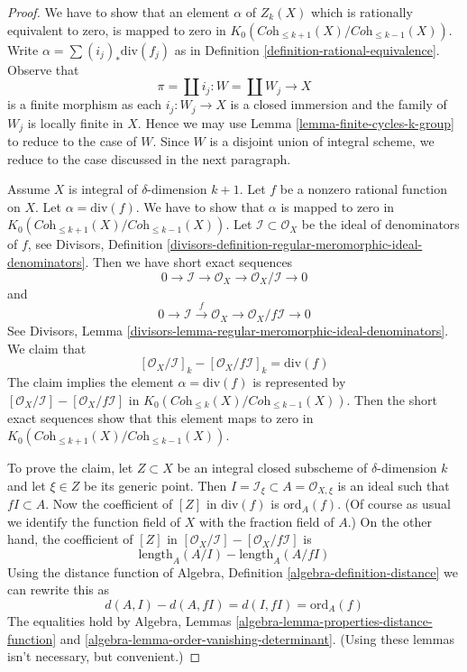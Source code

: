 \documentclass[10pt,a4paper]{amsart}
\theoremstyle{plain}
\theoremstyle{definition}
\theoremstyle{remark}
\numberwithin{equation}{subsection}
\begin{document}
\begin{proof}
We have to show that an element $\alpha$ of $Z_k(X)$ which is rationally
equivalent to zero, is mapped to zero in
$K_0(\textit{Coh}_{\leq k + 1}(X)/\textit{Coh}_{\leq k - 1}(X))$.
Write $\alpha = \sum (i_j)_*\text{div}(f_j)$ as in
Definition \ref{definition-rational-equivalence}.
Observe that
$$
\pi = \coprod i_j : W = \coprod W_j \longrightarrow X
$$
is a finite morphism as each $i_j : W_j \to X$ is a closed immersion
and the family of $W_j$ is locally finite in $X$. Hence we may use
Lemma \ref{lemma-finite-cycles-k-group} to reduce to the case of $W$.
Since $W$ is a disjoint union of integral scheme, we reduce
to the case discussed in the next paragraph.

\medskip\noindent
Assume $X$ is integral of $\delta$-dimension $k + 1$.
Let $f$ be a nonzero rational function on $X$.
Let $\alpha = \text{div}(f)$. We have to show that
$\alpha$ is mapped to zero in
$K_0(\textit{Coh}_{\leq k + 1}(X)/\textit{Coh}_{\leq k - 1}(X))$.
Let $\mathcal{I} \subset \mathcal{O}_X$ be the ideal of denominators
of $f$, see Divisors, Definition
\ref{divisors-definition-regular-meromorphic-ideal-denominators}.
Then we have short exact sequences
$$
0 \to \mathcal{I} \to \mathcal{O}_X \to \mathcal{O}_X/\mathcal{I} \to 0
$$
and
$$
0 \to \mathcal{I} \xrightarrow{f} \mathcal{O}_X \to
\mathcal{O}_X/f\mathcal{I} \to 0
$$
See Divisors, Lemma
\ref{divisors-lemma-regular-meromorphic-ideal-denominators}.
We claim that
$$
[\mathcal{O}_X/\mathcal{I}]_k - [\mathcal{O}_X/f\mathcal{I}]_k =
\text{div}(f)
$$
The claim implies the element $\alpha = \text{div}(f)$ is represented by
$[\mathcal{O}_X/\mathcal{I}] - [\mathcal{O}_X/f\mathcal{I}]$
in $K_0(\textit{Coh}_{\leq k}(X)/\textit{Coh}_{\leq k - 1}(X))$.
Then the short exact sequences show that this element maps to
zero in $K_0(\textit{Coh}_{\leq k + 1}(X)/\textit{Coh}_{\leq k - 1}(X))$.

\medskip\noindent
To prove the claim, let $Z \subset X$ be an integral closed subscheme
of $\delta$-dimension $k$ and let $\xi \in Z$ be its generic point.
Then $I = \mathcal{I}_\xi \subset A = \mathcal{O}_{X, \xi}$
is an ideal such that $fI \subset A$. Now the coefficient of
$[Z]$ in $\text{div}(f)$ is $\text{ord}_A(f)$. (Of course as usual
we identify the function field of $X$ with the fraction field of $A$.)
On the other hand, the coefficient of $[Z]$ in
$[\mathcal{O}_X/\mathcal{I}] - [\mathcal{O}_X/f\mathcal{I}]$
is
$$
\text{length}_A(A/I) - \text{length}_A(A/fI)
$$
Using the distance function of
Algebra, Definition \ref{algebra-definition-distance}
we can rewrite this as
$$
d(A, I) - d(A, fI) = d(I, fI) = \text{ord}_A(f)
$$
The equalities hold by Algebra, Lemmas
\ref{algebra-lemma-properties-distance-function} and
\ref{algebra-lemma-order-vanishing-determinant}.
(Using these lemmas isn't necessary, but convenient.)
\end{proof}
\end{document}
